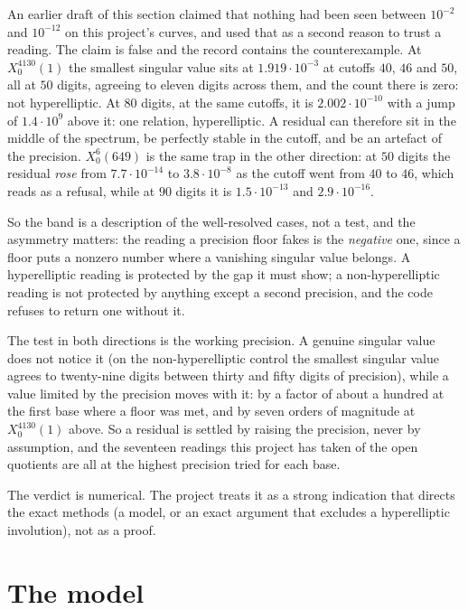 \documentclass[11pt,reqno]{amsart}
\theoremstyle{plain}
\theoremstyle{definition}
\begin{document}
An earlier draft of this section claimed that nothing had been seen between $10^{-2}$ and
$10^{-12}$ on this project's curves, and used that as a second reason to trust a reading. The
claim is false and the record contains the counterexample. At $X_0^{4130}(1)$ the smallest
singular value sits at $1.919\cdot10^{-3}$ at cutoffs $40$, $46$ and $50$, all at $50$ digits,
agreeing to eleven digits across them, and the count there is zero: not hyperelliptic. At $80$
digits, at the same cutoffs, it is $2.002\cdot10^{-10}$ with a jump of $1.4\cdot10^{9}$ above it:
one relation, hyperelliptic. A residual can therefore sit in the middle of the spectrum, be
perfectly stable in the cutoff, and be an artefact of the precision. $X_0^{6}(649)$ is the same
trap in the other direction: at $50$ digits the residual \emph{rose} from $7.7\cdot10^{-14}$ to
$3.8\cdot10^{-8}$ as the cutoff went from $40$ to $46$, which reads as a refusal, while at $90$
digits it is $1.5\cdot10^{-13}$ and $2.9\cdot10^{-16}$.

So the band is a description of the well-resolved cases, not a test, and the asymmetry matters:
the reading a precision floor fakes is the \emph{negative} one, since a floor puts a nonzero
number where a vanishing singular value belongs. A hyperelliptic reading is protected by the gap
it must show; a non-hyperelliptic reading is not protected by anything except a second precision,
and the code refuses to return one without it.

The test in both directions is the working precision. A genuine singular value does not notice it
(on the non-hyperelliptic control the smallest singular value agrees to twenty-nine digits between
thirty and fifty digits of precision), while a value limited by the precision moves with it: by a
factor of about a hundred at the first base where a floor was met, and by seven orders of
magnitude at $X_0^{4130}(1)$ above. So a residual is settled by raising the precision, never by
assumption, and the seventeen readings this project has taken of the open quotients are all at the
highest precision tried for each base.

The verdict is numerical. The project treats it as a strong indication that directs the exact
methods (a model, or an exact argument that excludes a hyperelliptic involution), not as a proof.

\section{The model}
\end{document}

